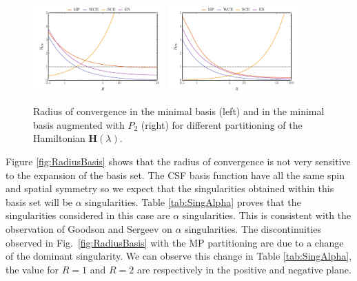 \documentclass[11pt,a4paper]{article}
\newcommand{\bH}{\mathbf{H}}
\begin{document}
\begin{figure}[h!]
    \centering
    \includegraphics[width=0.45\textwidth]{PartitioningRCV2.pdf}
    \includegraphics[width=0.45\textwidth]{PartitioningRCV3.pdf}
    \caption{\centering Radius of convergence in the minimal basis (left) and in the minimal basis augmented with $P_2$ (right) for different partitioning of the Hamiltonian $\bH(\lambda)$.}
    \label{fig:RadiusPartitioning}
\end{figure}

Figure \ref{fig:RadiusBasis} shows that the radius of convergence is not very sensitive to the expansion of the basis set. The CSF basis function have all the same spin and spatial symmetry so we expect that the singularities obtained within this basis set will be $\alpha$ singularities. Table \ref{tab:SingAlpha} proves that the singularities considered in this case are $\alpha$ singularities. This is consistent with the observation of Goodson and Sergeev \cite{Goodson_2004} on $\alpha$ singularities. The discontinuities observed in Fig.~\ref{fig:RadiusBasis} with the MP partitioning are due to a change of the dominant singularity. We can observe this change in Table \ref{tab:SingAlpha}, the value for $R=1$ and $R=2$ are respectively in the positive and negative plane.
\end{document}
